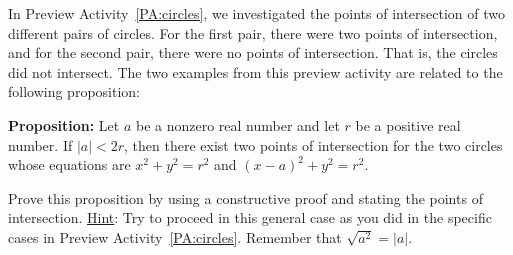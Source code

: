 \begin{activity} \label{A:circles}
In Preview Activity~\ref{PA:circles}, we investigated the points of intersection of two different pairs of circles.  For the first pair, there were two points of intersection, and for the second pair, there were no points of intersection.  That is, the circles did not intersect.  The two examples from this preview activity are related to the following proposition:
\begin{list}{}
\item \textbf{Proposition:}
Let  $a$  be a nonzero real number and let  $r$  be a positive real number.  If  $\left| a \right| < 2r$, then there exist two points of intersection for the two circles whose equations are    $x^2  + y^2  = r^2 $  and  $\left( {x - a} \right)^2  + y^2  = r^2 $.
\end{list}
\vskip10pt
\noindent
Prove this proposition by using a constructive proof and stating the points of intersection. \vskip10pt
\noindent
\underline{Hint}:  Try to proceed in this general case as you did in the specific cases in Preview Activity~\ref{PA:circles}.  Remember that  $\sqrt {a^2 }  = \left| a \right|$.
\end{activity}
\hbreak

\endinput





